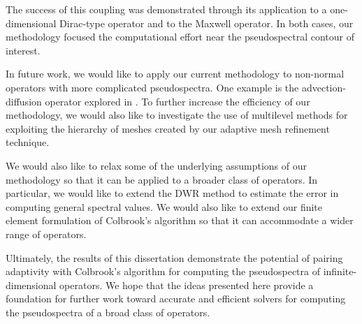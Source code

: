 The success of this coupling was demonstrated through its application to a one-dimensional Dirac-type operator and to the Maxwell operator. In both cases, our methodology focused the computational effort near the pseudospectral contour of interest. 

 In future work,  we would like to apply our current methodology to non-normal operators with more complicated pseudospectra. One example is the advection-diffusion operator explored in \cite{Nick}. To further increase the efficiency of our methodology, we would also like to investigate the use of multilevel methods for exploiting the hierarchy of meshes created by our adaptive mesh refinement technique. 
 
 We would also like to relax some of the underlying assumptions of our methodology so that it can be applied to a broader class of operators. In particular, we would like to extend the DWR method to estimate the error in computing general spectral values. We would also like to extend our finite element formulation of Colbrook's algorithm so that it can accommodate a wider range of operators. 

 
 

 Ultimately, the results of this dissertation demonstrate the potential of pairing adaptivity with Colbrook's algorithm for computing the pseudospectra of infinite-dimensional operators. We hope that the ideas presented here provide a foundation for further work toward accurate and efficient solvers for computing the pseudospectra of a broad class of operators.





